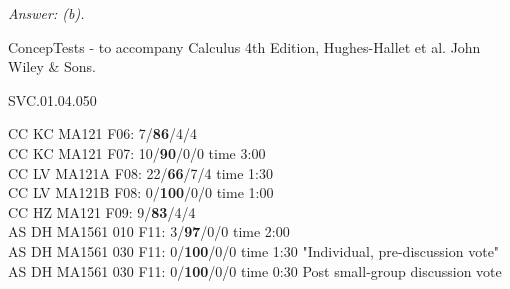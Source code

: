 {\it Answer: (b).} 

\medskip
ConcepTests - to accompany Calculus 4th Edition, Hughes-Hallet et al. John Wiley \& Sons.

SVC.01.04.050


CC KC MA121 F06: 7/{\bf 86}/4/4 \\
CC KC MA121 F07: 10/{\bf90}/0/0 time 3:00\\
CC LV MA121A F08: 22/{\bf66}/7/4 time 1:30\\
CC LV MA121B F08: 0/{\bf100}/0/0 time 1:00\\
CC HZ MA121 F09: 9/{\bf83}/4/4  \\
AS DH MA1561 010 F11: 3/{\bf97}/0/0 time 2:00  \\
AS DH MA1561 030 F11: 0/{\bf100}/0/0 time 1:30 "Individual, pre-discussion vote" \\
AS DH MA1561 030 F11: 0/{\bf100}/0/0 time 0:30 Post small-group discussion vote \\
